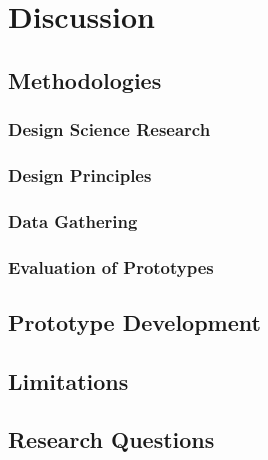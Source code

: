 \chapter{Discussion}
\section{Methodologies}
\subsection{Design Science Research}
\subsection{Design Principles}
\subsection{Data Gathering}
\subsection{Evaluation of Prototypes}
\section{Prototype Development}
\section{Limitations}
\section{Research Questions}
